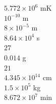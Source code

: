 {\begin{minipage}[t][][t]{.78\textwidth}
\end{minipage}%
\begin{minipage}[t][][t]{.3\textwidth}
     \begin{choices}
           \choice $5.772  \times 10^6$ mK   \\[-0.5em]
           \choice $10^{-10}$ m              \\[-0.5em]
           \choice $8 \times 10^{-5}$ m      \\[-0.5em]
           \choice $8.64 \times 10^4$ s      \\[-0.5em]
           \choice $27$                      \\[-0.5em]
           \choice $0.014$ g                 \\[-0.5em]
           \choice $21$                      \\[-0.5em]
           \choice $4.345 \times 10^{14}$ cm \\[-0.5em]
           \choice $1.5 \times 10^5$ kg      \\[-0.5em]
           \choice $8.672 \times 10^7$ min   \\[-0.5em]
     \end{choices}
\end{minipage}
     }

